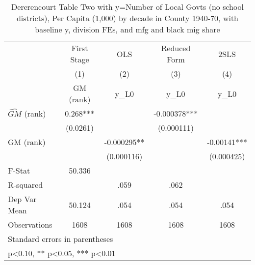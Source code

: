\begin{table}[htbp]\centering
\def\sym#1{\ifmmode^{#1}\else\(^{#1}\)\fi}
\caption{Dererencourt Table Two with y=Number of Local Govts (no school districts), Per Capita (1,000) by decade in County 1940-70, with baseline y, division FEs, and mfg and black mig share}
\begin{tabular}{l*{4}{c}}
\toprule
                    & First Stage   &         OLS   &Reduced Form   &        2SLS   \\
                    &\multicolumn{1}{c}{(1)}&\multicolumn{1}{c}{(2)}&\multicolumn{1}{c}{(3)}&\multicolumn{1}{c}{(4)}\\
                    &\multicolumn{1}{c}{GM  (rank)}&\multicolumn{1}{c}{y\_L0}&\multicolumn{1}{c}{y\_L0}&\multicolumn{1}{c}{y\_L0}\\
\midrule
$\hat{GM}$ (rank)   &       0.268***&               &   -0.000378***&               \\
                    &    (0.0261)   &               &  (0.000111)   &               \\
\addlinespace
GM  (rank)          &               &   -0.000295** &               &    -0.00141***\\
                    &               &  (0.000116)   &               &  (0.000425)   \\
\midrule
F-Stat              &      50.336   &               &               &               \\
R-squared           &               &        .059   &        .062   &               \\
Dep Var Mean        &      50.124   &        .054   &        .054   &        .054   \\
Observations        &        1608   &        1608   &        1608   &        1608   \\
\bottomrule
\multicolumn{5}{l}{\footnotesize Standard errors in parentheses}\\
\multicolumn{5}{l}{\footnotesize * p<0.10, ** p<0.05, *** p<0.01}\\
\end{tabular}
\end{table}
